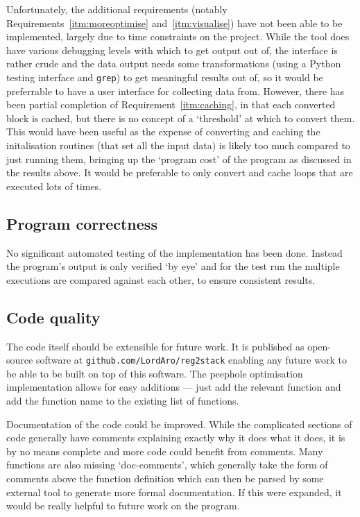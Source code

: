 Unfortunately, the additional requirements (notably
Requirements~\ref{itm:moreoptimise} and~\ref{itm:visualise}) have not been able
to be implemented, largely due to time constraints on the project. While the
tool does have various debugging levels with which to get output out of, the
interface is rather crude and the data output needs some transformations (using
a Python testing interface and \texttt{grep}) to get meaningful results out of,
so it would be preferrable to have a user interface for collecting data from.
However, there has been partial completion of Requirement~\ref{itm:caching}, in
that each converted block is cached, but there is no concept of a `threshold' at
which to convert them. This would have been useful as the expense of converting
and caching the initalisation routines (that set all the input data) is likely
too much compared to just running them, bringing up the `program cost' of the
program as discussed in the results above. It would be preferable to only
convert and cache loops that are executed lots of times.

\subsection{Program correctness}
No significant automated testing of the implementation has been done. Instead
the program's output is only verified `by eye' and for the test run the multiple
executions are compared against each other, to ensure consistent results.

\subsection{Code quality}
The code itself should be extensible for future work. It is published as
open-source software at \texttt{github.com/LordAro/reg2stack} enabling any
future work to be able to be built on top of this software. The peephole
optimisation implementation allows for easy additions --- just add the relevant
function and add the function name to the existing list of functions.

Documentation of the code could be improved. While the complicated sections of
code generally have comments explaining exactly why it does what it does, it is
by no means complete and more code could benefit from comments. Many functions
are also missing `doc-comments', which generally take the form of comments above
the function definition which can then be parsed by some external tool to
generate more formal documentation. If this were expanded, it would be really
helpful to future work on the program.

